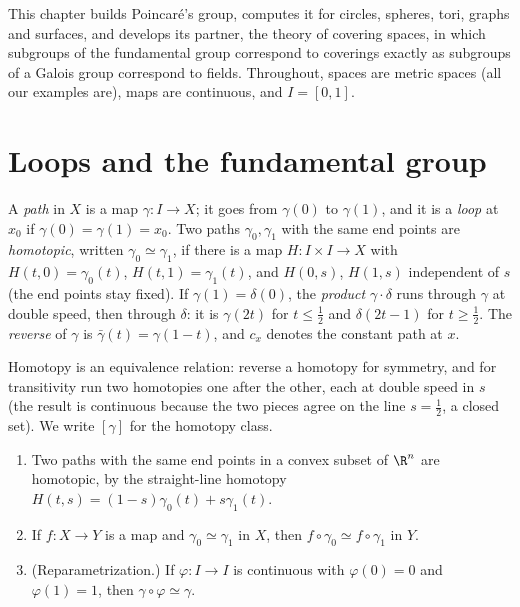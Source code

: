 This chapter builds Poincar\'e's group, computes it for circles, spheres, tori, graphs and surfaces, and develops its partner, the theory of covering
spaces, in which subgroups of the fundamental group correspond to coverings exactly as subgroups of a Galois group correspond to fields. Throughout,
spaces are metric spaces (all our examples are), maps are continuous, and $I=[0,1]$.

\section{Loops and the fundamental group}

\begin{definition}
A \emph{path} in $X$ is a map $\gamma\colon I\to X$; it goes from $\gamma(0)$ to $\gamma(1)$, and it is a \emph{loop} at $x_0$ if $\gamma(0)=\gamma(1)=x_0$. Two paths $\gamma_0,\gamma_1$ with the same
end points are \emph{homotopic}, written $\gamma_0\simeq\gamma_1$, if there is a map $H\colon I\times I\to X$ with $H(t,0)=\gamma_0(t)$, $H(t,1)=\gamma_1(t)$, and $H(0,s)$, $H(1,s)$ independent of $s$
(the end points stay fixed). If $\gamma(1)=\delta(0)$, the \emph{product} $\gamma\cdot\delta$ runs through $\gamma$ at double speed, then through $\delta$: it is $\gamma(2t)$ for $t\le\frac12$ and
$\delta(2t-1)$ for $t\ge\frac12$. The \emph{reverse} of $\gamma$ is $\bar\gamma(t)=\gamma(1-t)$, and $c_x$ denotes the constant path at $x$.
\end{definition}

Homotopy is an equivalence relation: reverse a homotopy for symmetry, and for transitivity run two homotopies one after the other, each at double
speed in $s$ (the result is continuous because the two pieces agree on the line $s=\frac12$, a closed set). We write $[\gamma]$ for the homotopy class.

\begin{lemma}\label{lem:convexhomotopy}
\begin{enumerate}
\item[(a)] Two paths with the same end points in a convex subset of $\R^n$ are homotopic, by the straight-line homotopy $H(t,s)=(1-s)\gamma_0(t)+s\gamma_1(t)$.
\item[(b)] If $f\colon X\to Y$ is a map and $\gamma_0\simeq\gamma_1$ in $X$, then $f\circ\gamma_0\simeq f\circ\gamma_1$ in $Y$.
\item[(c)] (Reparametrization.) If $\varphi\colon I\to I$ is continuous with $\varphi(0)=0$ and $\varphi(1)=1$, then $\gamma\circ\varphi\simeq\gamma$.
\end{enumerate}
\end{lemma}

